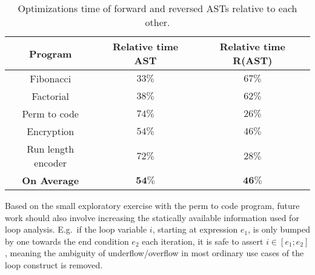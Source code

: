 \begin{table}[H]
    \centering
    \begin{tabular}{|c|c|c|}
        \hline
        Program            & Relative time AST & Relative time R(AST) \\
        \hline
        Fibonacci          & $33\%$            & $67\%$ \\
        \hline
        Factorial          & $38\%$            & $62\%$ \\
        \hline
        Perm to code       & $74\%$            & $26\%$ \\
        \hline
        Encryption         & $54\%$            & $46\%$ \\
        \hline
        Run length encoder & $72\%$            & $28\%$ \\
        \hline
        \hline
        \textbf{On Average}& $\mathbf{54\%}$   & $\mathbf{46\%}$ \\
        \hline
    \end{tabular}
    \caption{Optimizations time of forward and reversed ASTs relative to each other.}
    \label{tabel:relativeOptTime}
\end{table}
\noindent
Based on the small exploratory exercise with the perm to code program, future work should also
involve increasing the statically available information used for loop analysis. E.g.\ if
the loop variable $i$, starting at expression $e_1$, is only bumped by one towards the end
condition $e_2$ each iteration, it is safe to assert $i \in [e_1; e_2]$, meaning the ambiguity
of underflow/overflow in most ordinary use cases of the loop construct is removed.